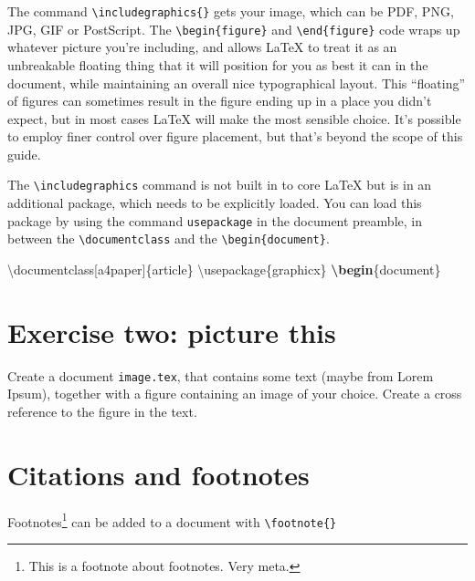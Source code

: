 \documentclass[
]{book}
\newenvironment{Shaded}{\begin{snugshade}}{\end{snugshade}}
\newcommand{\BuiltInTok}[1]{#1}
\newcommand{\ExtensionTok}[1]{#1}
\newcommand{\KeywordTok}[1]{\textcolor[rgb]{0.13,0.29,0.53}{\textbf{#1}}}
\newcommand{\NormalTok}[1]{#1}
\begin{document}
The command \texttt{\textbackslash{}includegraphics\{\}} gets your image, which can be PDF, PNG, JPG, GIF or PostScript. The \texttt{\textbackslash{}begin\{figure\}} and \texttt{\textbackslash{}end\{figure\}} code wraps up whatever picture you're including, and allows LaTeX to treat it as an unbreakable floating thing that it will position for you as best it can in the document, while maintaining an overall nice typographical layout. This ``floating'' of figures can sometimes result in the figure ending up in a place you didn't expect, but in most cases LaTeX will make the most sensible choice. It's possible to employ finer control over figure placement, but that's beyond the scope of this guide.

The \texttt{\textbackslash{}includegraphics} command is not built in to core LaTeX but is in an additional package, which needs to be explicitly loaded. You can load this package by using the command \texttt{usepackage} in the document preamble, in between the \texttt{\textbackslash{}documentclass} and the \texttt{\textbackslash{}begin\{document\}}.

\begin{Shaded}
\begin{Highlighting}[]
\BuiltInTok{\textbackslash{}documentclass}\NormalTok{[a4paper]\{}\ExtensionTok{article}\NormalTok{\}}
\BuiltInTok{\textbackslash{}usepackage}\NormalTok{\{}\ExtensionTok{graphicx}\NormalTok{\}}
\KeywordTok{\textbackslash{}begin}\NormalTok{\{}\ExtensionTok{document}\NormalTok{\}}
\end{Highlighting}
\end{Shaded}

\hypertarget{ex2}{%
\section{Exercise two: picture this}\label{ex2}}

Create a document \texttt{image.tex}, that contains some text (maybe from Lorem Ipsum), together with a figure containing an image of your choice. Create a cross reference to the figure in the text.

\hypertarget{citations-and-footnotes}{%
\section{Citations and footnotes}\label{citations-and-footnotes}}

Footnotes\footnote{This is a footnote about footnotes. Very meta.} can be added to a document with \texttt{\textbackslash{}footnote\{\}}
\end{document}

